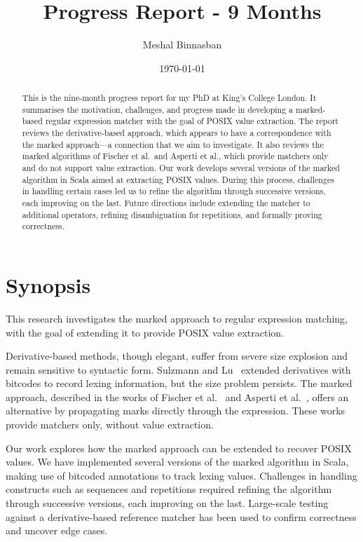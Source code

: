 \documentclass[12pt]{article}
\title{Progress Report - 9 Months}
\author{Meshal Binnasban}
\date{\today}
\begin{document}
\maketitle

\begin{abstract}
This is the nine-month progress report for my PhD at King’s College London.  
It summarises the motivation, challenges, and progress made in developing a marked-based regular expression matcher with the goal of POSIX value extraction.  
The report reviews the derivative-based approach, which appears to have a correspondence with the marked approach—a connection that we aim to investigate.  
It also reviews the marked algorithms of Fischer et al.\ and Asperti et al., which provide matchers only and do not support value extraction.  
Our work develops several versions of the marked algorithm in Scala aimed at extracting POSIX values.  
During this process, challenges in handling certain cases led us to refine the algorithm through successive versions, each improving on the last.  
Future directions include extending the matcher to additional operators, refining disambiguation for repetitions, and formally proving correctness.  
\end{abstract}

\newpage

\section*{Synopsis}
This research investigates the marked approach to regular expression 
matching, with the goal of extending it to provide POSIX value extraction.

Derivative-based methods, though elegant, suffer from severe size explosion and remain sensitive to syntactic form.  
Sulzmann and Lu~\cite{Sulzmann2014} extended derivatives with bitcodes to record lexing information, but the size problem persists.  
The marked approach, described in the works of Fischer et al.~\cite{Fischer2010} and Asperti et al.~\cite{Asperti2010}, offers an alternative by propagating marks directly through the expression.  
These works provide matchers only, without value extraction.  

Our work explores how the marked approach can be extended to recover POSIX values.  
We have implemented several versions of the marked algorithm in Scala, making use of bitcoded annotations to track lexing values.  
Challenges in handling constructs such as sequences and repetitions required refining the algorithm through successive versions, each improving on the last.  
Large-scale testing against a derivative-based reference matcher has been used to confirm correctness and uncover edge cases.  
\end{document}
